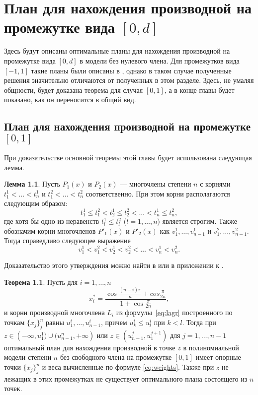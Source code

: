 \documentclass[specialist,
               substylefile = spbu.rtx,
               subf,href,colorlinks=true, 12pt]{disser}
\theoremstyle{definition}
\newtheorem{theorem}{Теорема}
\newtheorem{lemma}{Лемма}
\begin{document}
	
	
  
  \chapter{План для нахождения производной на промежутке вида $[0, d]$}
  
  Здесь будут описаны оптимальные планы для нахождения производной на промежутке вида $[0, d]$ в модели без нулевого члена. Для промежутков вида $[-1, 1] $ такие планы были описаны в \cite{melasmain}, однако в таком случае полученные решения значительно отличаются от полученных в этом разделе. Здесь, не умаляя общности, будет доказана теорема для случая $[0, 1]$, а в конце главы будет показано, как он переносится в общий вид. 
  
  \section{План для нахождения производной на промежутке $[0, 1]$}
  
  При доказательстве основной теоремы этой главы будет использована следующая лемма.
  
  \begin{lemma}
  \label{lemma:droots}
  	Пусть $P_1(x)$ и $P_2(x)$ --- многочлены степени $n$ с корнями $t^1_1 < \ldots < t^1_n$ и $t^2_1 < \ldots < t^2_n$ соответственно. При этом корни располагаются следующим образом:
  	\begin{equation*}
  		t^1_1 \leqslant t^2_1 < t^1_2 \leqslant t^2_2 < \ldots < t^1_n \leqslant t^2_n,
  	\end{equation*}
  	где хотя бы одно из неравенств $t_l^1 \leqslant t_l^2$ ($l = 1, \ldots, n$) является строгим. Также обозначим корни многочленов $P'_1(x)$ и $P'_2(x)$ как $v_1^1, \ldots, v_{n-1}^1$ и $v_1^2, \ldots, v_{n-1}^2$. Тогда справедливо следующее выражение
  	\begin{equation*}
  		v^1_1 < v^2_1 < v^1_2 < v^2_2 < \ldots < v^1_n < v^2_n.
  	\end{equation*}
  \end{lemma}
  Доказательство этого утверждения можно найти в \cite{sahmphd} или в приложении к \cite{melasmain}.
	
	\begin{theorem}
		Пусть для $i = 1, \ldots, n$ 
		\begin{equation}
			\label{eq:th1:points}
			x_i^* = \frac{\cos \frac{(n - i) \pi}{n} + cos \frac{\pi}{2n}}{1 + \cos \frac{\pi}{2n}} ,
		\end{equation}
		и корни производной многочлена $L_i$ из формулы~\eqref{eq:lagr} построенного по точкам $\{x_j\}_j^n$ равны $u_1^i, \ldots, u_{n-1}^i$, причем $u_k^i \leqslant u_l^i$ при $k < l$. Тогда при $z \in \left(-\infty, u_1^1) \cup (u_{n-1}^n, +\infty \right)$ или $z \in \left( u_{n-1}^j, u_1^{j+1} \right)$ для $j=1, \ldots, n-1$ оптимальный план для нахождения производной в точке $z$ в полиномиальной модели степени $n$ без свободного члена на промежутке $[0, 1]$ имеет опорные точки $\{x_j\}_j^n$ и веса вычисленные по формуле \eqref{eq:weights}. Также при $z$ не лежащих в этих промежутках не существует оптимального плана состоящего из $n$ точек.
	\end{theorem}
\end{document}
